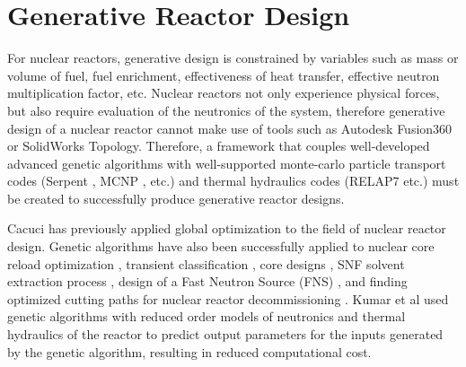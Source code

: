 \section{Generative Reactor Design}
For nuclear reactors, generative design is constrained by 
variables such as mass or volume of fuel, fuel enrichment, effectiveness 
of heat transfer, effective neutron multiplication factor, etc. 
Nuclear reactors not only experience physical forces, but also
require evaluation of the neutronics of the system, therefore generative design of 
a nuclear reactor cannot make use of tools such as Autodesk Fusion360 or SolidWorks 
Topology. 
Therefore, a framework that couples well-developed advanced genetic algorithms 
with well-supported monte-carlo particle transport 
codes (Serpent \cite{leppanen_serpent_2014}, 
MCNP \cite{werner_mcnp6._2018}, etc.) and thermal hydraulics 
codes (RELAP7 \cite{andrs_relap-7_2012} etc.)
must be created to successfully produce generative reactor designs. 

Cacuci \cite{cacuci_global_1990} has previously applied global optimization 
to the field of nuclear reactor design. 
Genetic algorithms have also been successfully applied to nuclear core reload optimization
\cite{dechaine_nuclear_1995,chapot_new_1999,schirru_genetic_1997,feltus_incorporating_1997}, 
transient classification \cite{alvarenga_adaptive_1997, mol_neural_2006}, 
core designs \cite{pereira_basic_1999,kumar_new_2015}, 
\gls{SNF} solvent extraction process 
\cite{omori_applications_1997}, design of a Fast Neutron Source (FNS) 
\cite{pevey_genetic_2019}, and finding optimized cutting paths for nuclear 
reactor decommissioning \cite{tsai_computer_2019}.  
Kumar et al \cite{kumar_new_2015} used genetic algorithms with reduced order models 
of neutronics and thermal hydraulics of the reactor to predict output parameters 
for the inputs generated by the genetic algorithm, resulting in reduced computational 
cost. 

